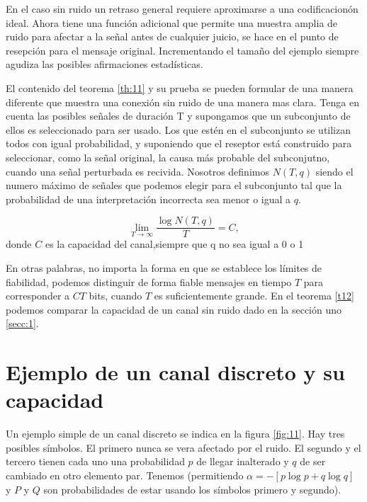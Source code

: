 En el caso sin ruido un retraso general requiere aproximarse a una codificacion\'on ideal. Ahora tiene una 
funci\'on adicional que permite una muestra amplia de ruido para afectar a la se\~{n}al antes de cualquier juicio, se hace 
en el punto de resepci\'on para el mensaje original. Incrementando el tama\~{n}o del ejemplo siempre agudiza las
posibles afirmaciones estad\'isticas.

El contenido del teorema \ref{th:11} y su prueba se pueden formular de una manera diferente que muestra 
una conexi\'on sin ruido de una manera mas clara. Tenga en cuenta las posibles se\~{n}ales de duraci\'on T y supongamos 
que un subconjunto de ellos es seleccionado para ser usado. Los que est\'en en el subconjunto se utilizan todos con igual probabilidad, y suponiendo 
que el reseptor est\'a construido para seleccionar, como la se\~{n}al original, la causa m\'as probable del subconjutno, cuando 
una se\~{n}al perturbada es recivida. Nosotros definimos $N(T,q)$ siendo el numero m\'aximo de se\~{n}ales que podemos elegir 
para el subconjunto tal que la probabilidad de una interpretaci\'{o}n incorrecta sea menor o igual a $q$.

\begin{theorem}
\label{th:12}
  \begin{equation} \lim_{T \to{} \infty}\frac{\log{N}(T,q)}{T} =
    C, \end{equation} donde $C$ es la capacidad del canal,siempre
    que q no sea igual a 0 o 1
\end{theorem}

En otras palabras, no importa la forma en que se establece los l\'imites de fiabilidad, podemos distinguir de forma fiable mensajes 
en tiempo $T$ para corresponder a $CT$ bits, cuando $T$ es suficientemente grande. 
En el teorema \ref{t12} podemos comparar la capacidad de un canal sin ruido dado en la secci\'on uno \ref{secc:1}.

\clearpage

\chapter{Ejemplo de un canal discreto y su capacidad}
\label{sec:15}

Un ejemplo simple de un canal discreto se indica en la figura \ref{fig:11}. Hay tres posibles s\'imbolos. El primero nunca se
vera afectado por el ruido. El segundo y el tercero tienen cada uno una probabilidad $p$ de llegar inalterado y 
$q$ de ser cambiado en otro elemento par. Tenemos (permitiendo $\alpha = -[p \log p + q\log{q}]$ y $P$ y $Q$ son 
probabilidades de estar usando los s\'imbolos primero y segundo).

